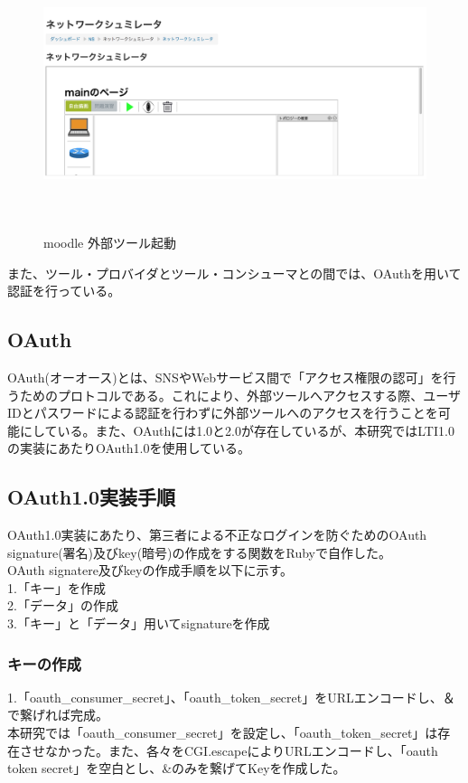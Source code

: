 \begin{figure}[htbp]
  \begin{center}
    \includegraphics[clip,width=12.0cm,height=8.0cm]{img/LTIstart.png}
    \caption{moodle 外部ツール起動}
    \label{fig:moodle kidou}
  \end{center}
\end{figure}
また、ツール・プロバイダとツール・コンシューマとの間では、OAuthを用いて認証を行っている。\\
\subsection{OAuth}
OAuth(オーオース)とは、SNSやWebサービス間で「アクセス権限の認可」を行うためのプロトコルである。これにより、外部ツールへアクセスする際、ユーザIDとパスワードによる認証を行わずに外部ツールへのアクセスを行うことを可能にしている。また、OAuthには1.0と2.0が存在しているが、本研究ではLTI1.0の実装にあたりOAuth1.0を使用している。
\subsection{OAuth1.0実装手順}
OAuth1.0実装にあたり、第三者による不正なログインを防ぐためのOAuth signature(署名)及びkey(暗号)の作成をする関数をRubyで自作した。\\
OAuth signatere及びkeyの作成手順を以下に示す。\\
1.「キー」を作成\\
2.「データ」の作成\\
3.「キー」と「データ」用いてsignatureを作成\\
\subsubsection{キーの作成}
1.「oauth\_consumer\_secret」、「oauth\_token\_secret」をURLエンコードし、＆で繋げれば完成。\\
本研究では「oauth\_consumer\_secret」を設定し、「oauth\_token\_secret」は存在させなかった。また、各々をCGI.escapeによりURLエンコードし、「oauth token secret」を空白とし、&のみを繋げてKeyを作成した。
